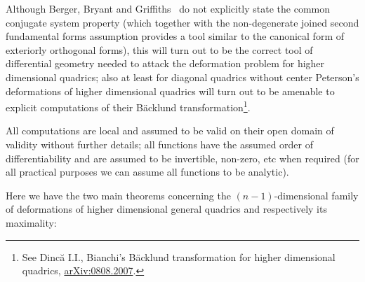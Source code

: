 \documentclass[pdftex]{sigma}
\begin{document}
Although Berger, Bryant and Grif\/f\/iths~\cite{B} do not explicitly
state the common conjugate system property (which together with
the non-degenerate joined second fundamental forms assumption
provides a tool similar to the canonical form of exteriorly
orthogonal forms), this will turn out to be the correct tool of
dif\/ferential geometry needed to attack the deformation problem for
higher dimensional quadrics; also at least for diagonal quadrics
without center Peterson's deformations of higher dimensional
quadrics will turn out to be amenable to explicit computations of
their B\"{a}cklund transformation\footnote{See Dinc\u{a} I.I., Bianchi's
B\"{a}cklund transformation for higher dimensional quadrics,
\href{http://arxiv.org/abs/0808.2007}{arXiv:0808.2007}.}.

All computations are local and assumed to be valid on their open
domain of validity without further details; all functions have the
assumed order of dif\/ferentiability and are assumed to be
invertible, non-zero, etc when required (for all practical
purposes we can assume all functions to be analytic).

Here we have the two main theorems concerning the
$(n-1)$-dimensional family of deformations of higher dimensional
general quadrics and respectively its maximality:
\end{document}
